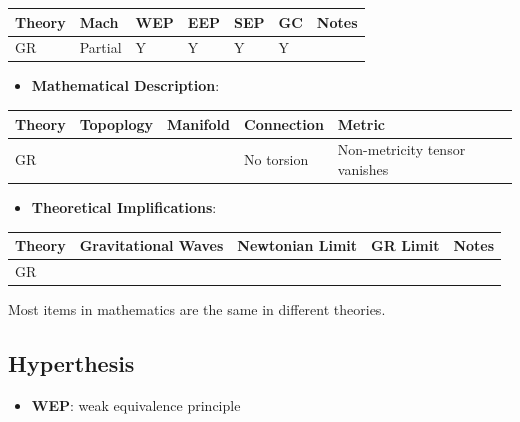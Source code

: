 \documentclass[letterpaper,10pt,english]{sphinxmanual}
\begin{document}
{\begin{itemize}
\end{itemize}

\begin{tabulary}{\linewidth}{|L|L|L|L|L|L|L|}
\hline
\textsf{\relax 
Theory
} & \textsf{\relax 
Mach
} & \textsf{\relax 
WEP
} & \textsf{\relax 
EEP
} & \textsf{\relax 
SEP
} & \textsf{\relax 
GC
} & \textsf{\relax 
Notes
}\\
\hline
GR
 & 
Partial
 & 
Y
 & 
Y
 & 
Y
 & 
Y
 & \\
\hline\end{tabulary}

\begin{itemize}
\item {} 
\textbf{Mathematical Description}:

\end{itemize}

\begin{tabulary}{\linewidth}{|L|L|L|L|L|}
\hline
\textsf{\relax 
Theory
} & \textsf{\relax 
Topoplogy
} & \textsf{\relax 
Manifold
} & \textsf{\relax 
Connection
} & \textsf{\relax 
Metric
}\\
\hline
GR
 &  &  & 
No torsion
 & 
Non-metricity tensor vanishes
\\
\hline\end{tabulary}

\begin{itemize}
\item {} 
\textbf{Theoretical Implifications}:

\end{itemize}

\begin{tabulary}{\linewidth}{|L|L|L|L|L|}
\hline
\textsf{\relax 
Theory
} & \textsf{\relax 
Gravitational Waves
} & \textsf{\relax 
Newtonian Limit
} & \textsf{\relax 
GR Limit
} & \textsf{\relax 
Notes
}\\
\hline
GR
 &  &  &  & \\
\hline\end{tabulary}


Most items in mathematics are the same in different theories.


\subsection{Hyperthesis}
\label{GeneralRelativityAdv:hyperthesis}\begin{itemize}
\item {} 
\textbf{WEP}: weak equivalence principle


\end{itemize}}
\end{document}
